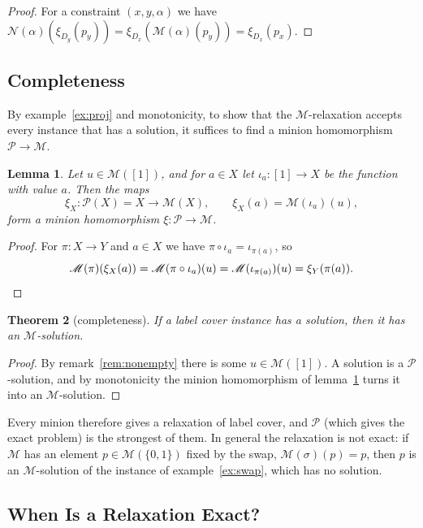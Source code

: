 \documentclass[11pt]{article}
\theoremstyle{plain}
\newtheorem{theorem}{Theorem}[section]
\newtheorem{lemma}[theorem]{Lemma}
\theoremstyle{definition}
\newcommand{\Pm}{\mathscr{P}}
\newcommand{\M}{\mathscr{M}}
\newcommand{\N}{\mathscr{N}}
\begin{document}
\begin{proof}
For a constraint $(x,y,\alpha)$ we have $\N(\alpha)(\xi_{D_y}(p_y))=\xi_{D_x}(\M(\alpha)(p_y))=\xi_{D_x}(p_x)$.
\end{proof}

\subsection{Completeness}

By example~\ref{ex:proj} and monotonicity, to show that the $\M$-relaxation accepts every instance that has a solution, it suffices to find a minion homomorphism $\Pm\to\M$.

\begin{lemma}\label{lem:proj-hom}
Let $u\in\M([1])$, and for $a\in X$ let $\iota_a\colon[1]\to X$ be the function with value $a$. Then the maps
\[
\xi_X\colon\Pm(X)=X\to\M(X),\qquad\xi_X(a)=\M(\iota_a)(u),
\]
form a minion homomorphism $\xi\colon\Pm\to\M$.
\end{lemma}

\begin{proof}
For $\pi\colon X\to Y$ and $a\in X$ we have $\pi\circ\iota_a=\iota_{\pi(a)}$, so
\[
\M(\pi)(\xi_X(a))=\M(\pi\circ\iota_a)(u)=\M(\iota_{\pi(a)})(u)=\xi_Y(\pi(a)).\qedhere
\]
\end{proof}

\begin{theorem}[completeness]\label{thm:complete}
If a label cover instance has a solution, then it has an $\M$-solution.
\end{theorem}

\begin{proof}
By remark~\ref{rem:nonempty} there is some $u\in\M([1])$. A solution is a $\Pm$-solution, and by monotonicity the minion homomorphism of lemma~\ref{lem:proj-hom} turns it into an $\M$-solution.
\end{proof}

Every minion therefore gives a relaxation of label cover, and $\Pm$ (which gives the exact problem) is the strongest of them. In general the relaxation is not exact: if $\M$ has an element $p\in\M(\{0,1\})$ fixed by the swap, $\M(\sigma)(p)=p$, then $p$ is an $\M$-solution of the instance of example~\ref{ex:swap}, which has no solution.

\subsection{When Is a Relaxation Exact?}\label{sec:exact}
\end{document}

